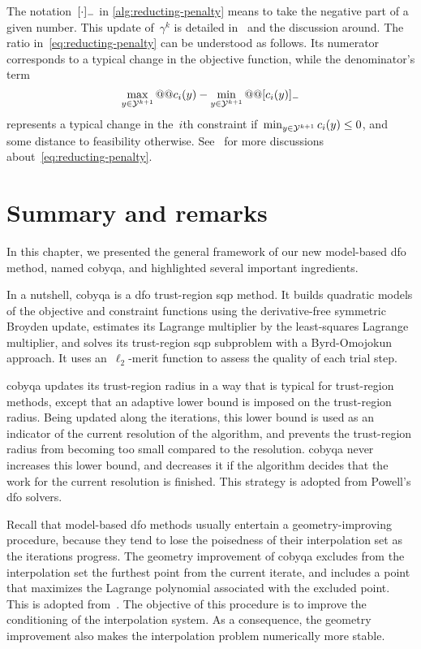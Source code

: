 The notation~$[\cdot]_-$ in \cref{alg:reducting-penalty} means to take the negative part of a given number.
This update of~$\gamma^k$ is detailed in~\cite[Eq.~(12) and~(13)]{Powell_1994} and the discussion around.
The ratio in~\cref{eq:reducting-penalty} can be understood as follows.
Its numerator corresponds to a typical change in the objective function, while the denominator's term
\begin{equation*}
    \max_{y \in \xpt[k + 1]} @@ \con{i}(y) - \min_{y \in \xpt[k + 1]} @@ \negp{\con{i}(y)}
\end{equation*}
represents a typical change in the~$i$th constraint if~$\min_{y \in \xpt[k + 1]} \con{i}(y) \le 0$, and some distance to feasibility otherwise.
See~\cite[\S~4]{Powell_1994} for more discussions about~\cref{eq:reducting-penalty}.

\section{Summary and remarks}

In this chapter, we presented the general framework of our new model-based \gls{dfo} method, named \gls{cobyqa}, and highlighted several important ingredients.

In a nutshell, \gls{cobyqa} is a \gls{dfo} trust-region \gls{sqp} method.
It builds quadratic models of the objective and constraint functions using the derivative-free symmetric Broyden update, estimates its Lagrange multiplier by the least-squares Lagrange multiplier, and solves its trust-region \gls{sqp} subproblem with a Byrd-Omojokun approach.
It uses an~$\ell_2$-merit function to assess the quality of each trial step.

\Gls{cobyqa} updates its trust-region radius in a way that is typical for trust-region methods, except that an adaptive lower bound is imposed on the trust-region radius.
Being updated along the iterations, this lower bound is used as an indicator of the current resolution of the algorithm, and prevents the trust-region radius from becoming too small compared to the resolution.
\Gls{cobyqa} never increases this lower bound, and decreases it if the algorithm decides that the work for the current resolution is finished.
This strategy is adopted from Powell's \gls{dfo} solvers.

Recall that model-based \gls{dfo} methods usually entertain a geometry-improving procedure, because they tend to lose the poisedness of their interpolation set as the iterations progress.
The geometry improvement of \gls{cobyqa} excludes from the interpolation set the furthest point from the current iterate, and includes a point that maximizes the Lagrange polynomial associated with the excluded point.
This is adopted from~\cite{Powell_2006,Powell_2009}.
The objective of this procedure is to improve the conditioning of the interpolation system.
As a consequence, the geometry improvement also makes the interpolation problem numerically more stable.

